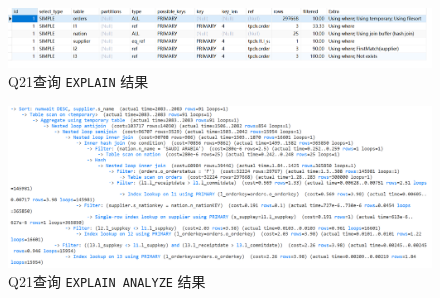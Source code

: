 \documentclass{article}
\renewcommand\tt{\texttt}
\begin{document}
\begin{enumerate}
\begin{figure}[H]
\centering
\includegraphics[width=1\textwidth]{img/41.png}
\caption{Q21查询 \tt{EXPLAIN} 结果}
\end{figure}

\begin{figure}[H]
\centering
\includegraphics[width=1\textwidth]{img/42.png}
\caption{Q21查询 \tt{EXPLAIN ANALYZE} 结果}
\end{figure}


\end{enumerate}
\end{document}
